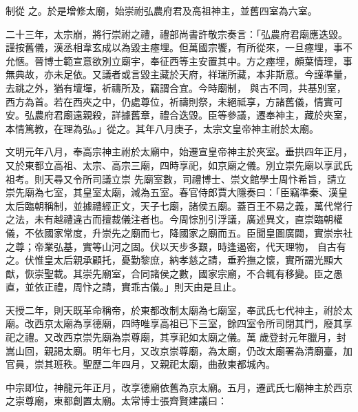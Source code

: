 \begin{pinyinscope}
 制從
 之。於是增修太廟，始崇祔弘農府君及高祖神主，並舊四室為六室。



 二十三年，太宗崩，將行崇祔之禮，禮部尚書許敬宗奏言：「弘農府君廟應迭毀。謹按舊儀，漢丞相韋玄成以為毀主瘞埋。但萬國宗饗，有所從來，一旦瘞埋，事不允愜。晉博士範宣意欲別立廟宇，奉征西等主安置其中。方之瘞埋，頗葉情理，事無典故，亦未足依。又議者或言毀主藏於天府，祥瑞所藏，本非斯意。今謹準量，去祧之外，猶有壇墠，祈禱所及，竊謂合宜。今時廟制，
 與古不同，共基別室，西方為首。若在西夾之中，仍處尊位，祈禱則祭，未絕祗享，方諸舊儀，情實可安。弘農府君廟遠親殺，詳據舊章，禮合迭毀。臣等參議，遷奉神主，藏於夾室，本情篤教，在理為弘。」從之。其年八月庚子，太宗文皇帝神主祔於太廟。



 文明元年八月，奉高宗神主祔於太廟中，始遷宣皇帝神主於夾室。垂拱四年正月，又於東都立高祖、太宗、高宗三廟，四時享祀，如京廟之儀。別立崇先廟以享武氏祖考。則天尋又令所司議立崇
 先廟室數，司禮博士、崇文館學士周忭希旨，請立崇先廟為七室，其皇室太廟，減為五室。春官侍郎賈大隱奏曰：「臣竊準秦、漢皇太后臨朝稱制，並據禮經正文，天子七廟，諸侯五廟。蓋百王不易之義，萬代常行之法，未有越禮違古而擅裁儀注者也。今周悰別引浮議，廣述異文，直崇臨朝權儀，不依國家常度，升崇先之廟而七，降國家之廟而五。臣聞皇圖廣闢，實崇宗社之尊；帝業弘基，實等山河之固。伏以天步多艱，時逢遏密，代天理物，
 自古有之。伏惟皇太后親承顧托，憂勤黎庶，納孝慈之請，垂矜撫之懷，實所謂光顯大猷，恢崇聖載。其崇先廟室，合同諸侯之數，國家宗廟，不合輒有移變。臣之愚直，並依正禮，周忭之請，實乖古儀。」則天由是且止。



 天授二年，則天既革命稱帝，於東都改制太廟為七廟室，奉武氏七代神主，祔於太廟。改西京太廟為享德廟，四時唯享高祖已下三室，餘四室令所司閉其門，廢其享祀之禮。又改西京崇先廟為崇尊廟，其享祀如太廟之儀。萬
 歲登封元年臘月，封嵩山回，親謁太廟。明年七月，又改京崇尊廟，為太廟，仍改太廟署為清廟臺，加官員，崇其班秩。聖歷二年四月，又親祀太廟，曲赦東都城內。



 中宗即位，神龍元年正月，改享德廟依舊為京太廟。五月，遷武氏七廟神主於西京之崇尊廟，東都創置太廟。太常博士張齊賢建議曰：




\end{pinyinscope}
